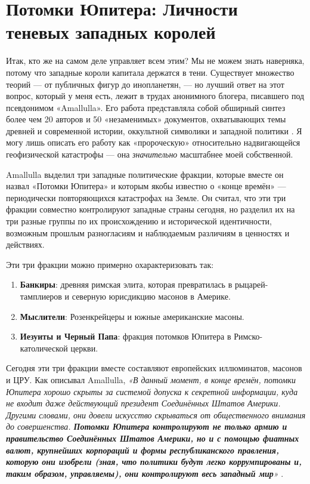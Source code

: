 \documentclass[10pt,twocolumn,letterpaper]{article}
\begin{document}
\section{Потомки Юпитера: Личности теневых западных королей}
Итак, кто же на самом деле управляет всем этим? Мы не можем знать наверняка, потому что западные короли капитала держатся в тени. Существует множество теорий — от публичных фигур до инопланетян, — но лучший ответ на этот вопрос, который у меня есть, лежит в трудах анонимного блогера, писавшего под псевдонимом «Amallulla». Его работа представляла собой обширный синтез более чем 20 авторов и 50 «незаменимых» документов, охватывающих темы древней и современной истории, оккультной символики и западной политики \cite{33,34}. Я могу лишь описать его работу как «пророческую» относительно надвигающейся геофизической катастрофы — она \textit{значительно} масштабнее моей собственной.

Amallulla выделил три западные политические фракции, которые вместе он назвал «Потомки Юпитера» и которым якобы известно о «конце времён» — периодически повторяющихся катастрофах на Земле. Он считал, что эти три фракции совместно контролируют западные страны сегодня, но разделил их на три разные группы по их происхождению и исторической идентичности, возможным прошлым разногласиям и наблюдаемым различиям в ценностях и действиях.

Эти три фракции можно примерно охарактеризовать так:

\begin{flushleft}
\begin{enumerate}
    \item \textbf{Банкиры}: древняя римская элита, которая превратилась в рыцарей-тамплиеров и северную юрисдикцию масонов в Америке.
    \item \textbf{Мыслители}: Розенкрейцеры и южные американские масоны.
    \item \textbf{Иезуиты и Черный Папа}: фракция потомков Юпитера в Римско-католической церкви.
\end{enumerate}
\end{flushleft}

Сегодня эти три фракции вместе составляют европейских иллюминатов, масонов и ЦРУ. Как описывал Amallulla, \textit{«В данный момент, в конце времён, потомки Юпитера хорошо скрыты за системой допуска к секретной информации, куда не входит даже действующий президент Соединённых Штатов Америки. Другими словами, они довели искусство скрываться от общественного внимания до совершенства. \textbf{Потомки Юпитера контролируют не только армию и правительство Соединённых Штатов Америки, но и с помощью фиатных валют, крупнейших корпораций и формы республиканского правления, которую они изобрели (зная, что политики будут легко коррумпированы и, таким образом, управляемы), они контролируют весь западный мир}»} \cite{33,34}.
\end{document}
